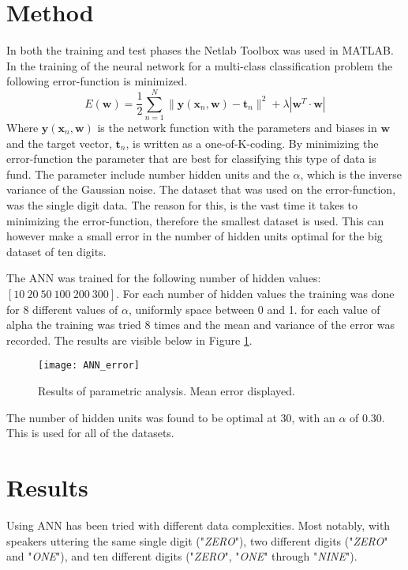 \section{Method}
In both the training and test phases the Netlab Toolbox  was used in MATLAB.
In the training of the neural network for a multi-class classification problem the following error-function is minimized.
\begin{equation}
E(\mathbf{w}) = \dfrac{1}{2} \sum_{n=1}^{N}\| \mathbf{y}(\mathbf{x}_n,\mathbf{w})-\mathbf{t}_n \|^2+\lambda| \mathbf{w}^T \cdot \mathbf{w}|
\label{eq:ANN_error}
\end{equation}
Where $ \mathbf{y}(\mathbf{x}_n,\mathbf{w}) $ is the network function with the parameters and biases in $ \mathbf{w} $ and the target vector, $ \mathbf{t}_n $, is written as a one-of-K-coding.
By minimizing the error-function the parameter that are best for classifying this type of data is fund. 
The parameter include number hidden units and the $\alpha$, which is the inverse variance of the Gaussian noise.
The dataset that was used on the error-function, was the single digit data.
The reason for this, is the vast time it takes to minimizing the error-function, therefore the smallest dataset is used.
This can however make a small error in the number of hidden units optimal for the big dataset of ten digits. 

The ANN was trained for the following number of hidden values: $ [10\ 20\ 50\ 100\ 200\ 300] $.
For each number of hidden values the training was done for $ 8 $ different values of $ \alpha $, uniformly space between 0 and 1.
for each value of alpha the training was tried 8 times and the mean and variance of the error was recorded. The results are visible below in Figure \ref{fig:ANN_error}.

\begin{figure}[H]
\centering
\texttt{[image: ANN\_error]}
\caption{Results of parametric analysis. Mean error displayed.}
\label{fig:ANN_error}
\end{figure}

The number of hidden units was found to be optimal at 30, with an $ \alpha $ of 0.30. This is used for all of the datasets.

\section{Results}
Using ANN has been tried with different data complexities.
Most notably, with speakers uttering the same single digit ("\textit{ZERO}"), two different digits ("\textit{ZERO}" and "\textit{ONE}"), and ten different digits ("\textit{ZERO}", "\textit{ONE}" through "\textit{NINE}").

